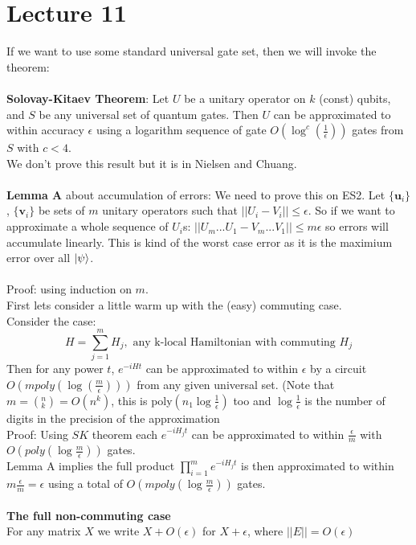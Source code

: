 \documentclass{article}
\begin{document}
\section{Lecture 11}
If we want to use some standard universal gate set, then we will invoke the theorem: \\\\
\textbf{Solovay-Kitaev Theorem}: Let $U$ be a unitary operator on $k$ (const) qubits, and $S$ be any universal set of quantum gates. Then $U$ can be approximated to within accuracy $\epsilon$ using a logarithm sequence of gate $O(\log^c (\frac{1}{\epsilon}))$ gates from $S$ with $c<4$. \\ We don't prove this result but it is in Nielsen and Chuang.\\\\
\textbf{Lemma A} about accumulation of errors: We need to prove this on ES2. Let $\{\bm u_i\}$, $\{ \bm v_i\}$ be sets of $m$ unitary operators such that $|| U_i - V_i || \leq \epsilon$. So if we want to approximate a whole sequence of $U_i$s: $||U_m...U_1 - V_m...V_1|| \leq m \epsilon$ so errors will accumulate linearly. This is kind of the worst case error as it is the maximium error over all $\ket{\psi}$.\\\\
Proof: using induction on $m$.\\ First lets consider a little warm up with the (easy) commuting case.\\
Consider the case:
$$
H = \sum_{j=1}^m H_j, \text{ any k-local Hamiltonian with commuting }H_j
$$
Then for any power $t$, $e^{-iHt}$ can be approximated to within $\epsilon$ by a circuit $O(m poly(\log (\frac{m}{\epsilon})))$ from any given universal set. (Note that $m = (^n_k) = O(n^k)$, this is poly$(n_1 \log \frac{1}{\epsilon})$ too and $\log \frac{1}{\epsilon}$ is the number of digits in the precision of the approximation\\
Proof: Using $SK$ theorem each $e^{-iH_jt}$ can be approximated to within $\frac{\epsilon}{m}$ with $O(poly(\log \frac{m}{\epsilon}))$ gates.\\
Lemma A implies the full product $\prod_{i=1}^m e^{-i H_j t}$ is then approximated to within $m \frac{\epsilon}{m} = \epsilon$ using a total of $O(m poly(\log \frac{m}{\epsilon}))$ gates.\\\\
\textbf{The full non-commuting case}\\
For any matrix $X$ we write $X + O(\epsilon)$ for $X + \epsilon$, where $||E|| = O(\epsilon)$\\
\end{document}
